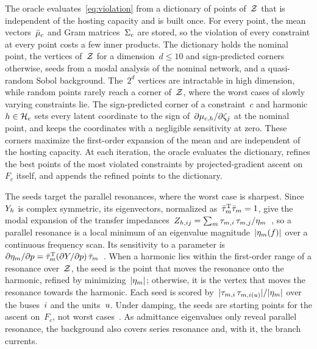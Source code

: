 The oracle evaluates~\eqref{eq:violation} from a dictionary of points of~$\mathcal{Z}$ that is independent of the hosting capacity and is built once. For every point, the mean vectors~$\bar{\mu}_{c}$ and Gram matrices~$\Sigma_{c}$ are stored, so the violation of every constraint at every point costs a few inner products. The dictionary holds the nominal point, the vertices of~$\mathcal{Z}$ for a dimension~$d \leq 10$ and sign-predicted corners otherwise, seeds from a modal analysis of the nominal network, and a quasi-random Sobol background. The~$2^{d}$ vertices are intractable in high dimension, while random points rarely reach a corner of~$\mathcal{Z}$, where the worst cases of slowly varying constraints lie. The sign-predicted corner of a constraint~$c$ and harmonic~$h \in \mathcal{H}_{c}$ sets every latent coordinate to the sign of~$\partial \mu_{c,h}/\partial \zeta_{j}$ at the nominal point, and keeps the coordinates with a negligible sensitivity at zero. These corners maximize the first-order expansion of the mean and are independent of the hosting capacity. At each iteration, the oracle evaluates the dictionary, refines the best points of the most violated constraints by projected-gradient ascent on~$F_{c}$ itself, and appends the refined points to the dictionary. 

The seeds target the parallel resonances, where the worst case is sharpest. Since~$Y_{h}$ is complex symmetric, its eigenvectors, normalized as~$\bar{\tau}_{m}^{\text{T}}\bar{\tau}_{m} = 1$, give the modal expansion of the transfer impedances~$Z_{h,ij} = \sum_{m} \tau_{m,i}\,\tau_{m,j}/\eta_{m}$~\cite{xu_harmonic_2005}, so a parallel resonance is a local minimum of an eigenvalue magnitude~$|\eta_{m}(f)|$ over a continuous frequency scan. Its sensitivity to a parameter is~$\partial \eta_{m}/\partial p = \bar{\tau}_{m}^{\text{T}} (\partial Y/\partial p)\, \bar{\tau}_{m}$~\cite{huang_application_2007}. When a harmonic lies within the first-order range of a resonance over~$\mathcal{Z}$, the seed is the point that moves the resonance onto the harmonic, refined by minimizing~$|\eta_{m}|$; otherwise, it is the vertex that moves the resonance towards the harmonic. Each seed is scored by~$|\tau_{m,i}\,\tau_{m,i(u)}|/|\eta_{m}|$ over the buses~$i$ and the units~$u$. Under damping, the seeds are starting points for the ascent on~$F_{c}$, not worst cases~\cite{xu_harmonic_2005}. As admittance eigenvalues only reveal parallel resonance, the background also covers series resonance and, with it, the branch currents.
